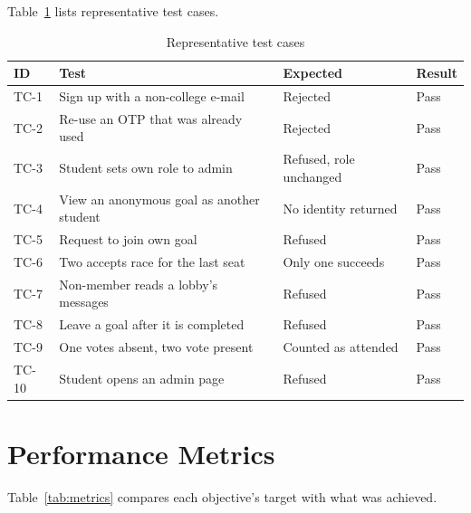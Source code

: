 \documentclass[twoside,12pt]{tietreport}
\begin{document}
Table~\ref{tab:testcases} lists representative test cases.

\begin{table}[!htbp]\centering
\centering
\small
\begin{tabular}{@{}lp{5.4cm}p{3.6cm}l@{}}
\toprule
\textbf{ID} & \textbf{Test} & \textbf{Expected} & \textbf{Result} \\
\midrule
TC-1 & Sign up with a non-college e-mail & Rejected & Pass \\
TC-2 & Re-use an OTP that was already used & Rejected & Pass \\
TC-3 & Student sets own role to admin & Refused, role unchanged & Pass \\
TC-4 & View an anonymous goal as another student & No identity returned & Pass \\
TC-5 & Request to join own goal & Refused & Pass \\
TC-6 & Two accepts race for the last seat & Only one succeeds & Pass \\
TC-7 & Non-member reads a lobby's messages & Refused & Pass \\
TC-8 & Leave a goal after it is completed & Refused & Pass \\
TC-9 & One votes absent, two vote present & Counted as attended & Pass \\
TC-10 & Student opens an admin page & Refused & Pass \\
\bottomrule
\end{tabular}
\caption{Representative test cases}
\label{tab:testcases}
\end{table}

\section{Performance Metrics}
\label{sec:metrics}

Table~\ref{tab:metrics} compares each objective's target with what was achieved.
\end{document}
